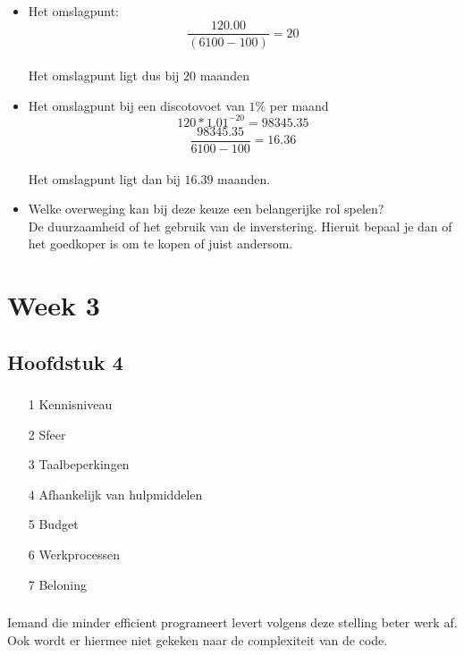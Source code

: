 \documentclass[a4paper,titlepage]{artikel1}
\begin{document}
\subsubsection[Opdracht 5]{}
\begin{itemize}
\item Het omslagpunt:
\begin{displaymath}
\frac{120.00}{(6100-100)}=20
\end{displaymath}
\\Het omslagpunt ligt dus bij 20 maanden
\item Het omslagpunt bij een discotovoet van $1\%$ per maand
\begin{displaymath}
120*1.01^{-20}=98345.35
\end{displaymath}
\begin{displaymath}
\frac{98345.35}{6100-100}=16.36
\end{displaymath}
\\Het omslagpunt ligt dan bij $16.39$ maanden.
\item Welke overweging kan bij deze keuze een belangerijke rol spelen?\\De duurzaamheid of het gebruik van de inverstering. Hieruit bepaal je dan of het goedkoper is om te kopen of juist andersom.
\end{itemize}

\section{Week 3}
\subsection{Hoofdstuk 4}
\subsubsection[Opdracht 1]{}
\begin{itemize}
\item[1] Kennisniveau
\item[2] Sfeer
\item[3] Taalbeperkingen
\item[4] Afhankelijk van hulpmiddelen
\item[5] Budget
\item[6] Werkprocessen
\item[7] Beloning
\end{itemize}

\subsubsection[Opdracht 2]{}
Iemand die minder efficient programeert levert volgens deze stelling beter werk af. Ook wordt er hiermee niet gekeken naar de complexiteit van de code.
\end{document}

